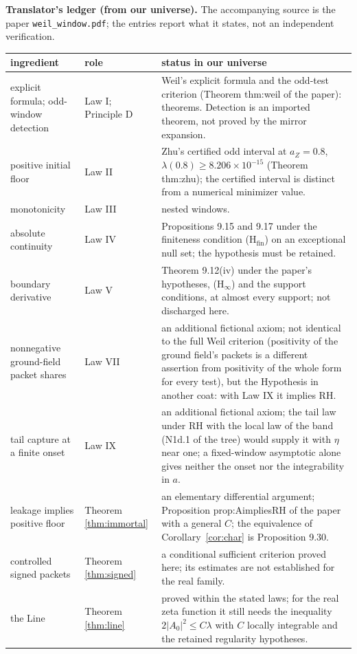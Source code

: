 \documentclass[11pt]{article}
\theoremstyle{definition}
\theoremstyle{remark}
\begin{document}
\begin{mdframed}[backgroundcolor=black!4,linewidth=0.4pt]
\small\textbf{Translator's ledger (from our universe).} The accompanying source is the paper \texttt{weil\_window.pdf}; the entries report what it states, not an independent verification.

\smallskip
\begin{tabular}{@{}p{3.4cm}p{2.3cm}p{9.6cm}@{}}
\toprule
ingredient & role & status in our universe\\
\midrule
explicit formula; odd-window detection & Law I; Principle D & Weil's explicit formula and the odd-test criterion (Theorem thm:weil of the paper): theorems. Detection is an imported theorem, not proved by the mirror expansion.\\
positive initial floor & Law II & Zhu's certified odd interval at $a_Z=0.8$, $\lambda(0.8)\ge8.206\times10^{-15}$ (Theorem thm:zhu); the certified interval is distinct from a numerical minimizer value.\\
monotonicity & Law III & nested windows.\\
absolute continuity & Law IV & Propositions 9.15 and 9.17 under the finiteness condition (H$_{\mathrm{fin}}$) on an exceptional null set; the hypothesis must be retained.\\
boundary derivative & Law V & Theorem 9.12(iv) under the paper's hypotheses, (H$_\infty$) and the support conditions, at almost every support; not discharged here.\\
nonnegative ground-field packet shares & Law VII & an additional fictional axiom; not identical to the full Weil criterion (positivity of the ground field's packets is a different assertion from positivity of the whole form for every test), but the Hypothesis in another coat: with Law IX it implies RH.\\
tail capture at a finite onset & Law IX & an additional fictional axiom; the tail law under RH with the local law of the band (N1d.1 of the tree) would supply it with $\eta$ near one; a fixed-window asymptotic alone gives neither the onset nor the integrability in $a$.\\
leakage implies positive floor & Theorem \ref{thm:immortal} & an elementary differential argument; Proposition prop:AimpliesRH of the paper with a general $C$; the equivalence of Corollary~\ref{cor:char} is Proposition 9.30.\\
controlled signed packets & Theorem \ref{thm:signed} & a conditional sufficient criterion proved here; its estimates are not established for the real family.\\
the Line & Theorem \ref{thm:line} & proved within the stated laws; for the real zeta function it still needs the inequality $2|A_0|^2\le C\lambda$ with $C$ locally integrable and the retained regularity hypotheses.\\
\bottomrule
\end{tabular}
\end{mdframed}
\end{document}
